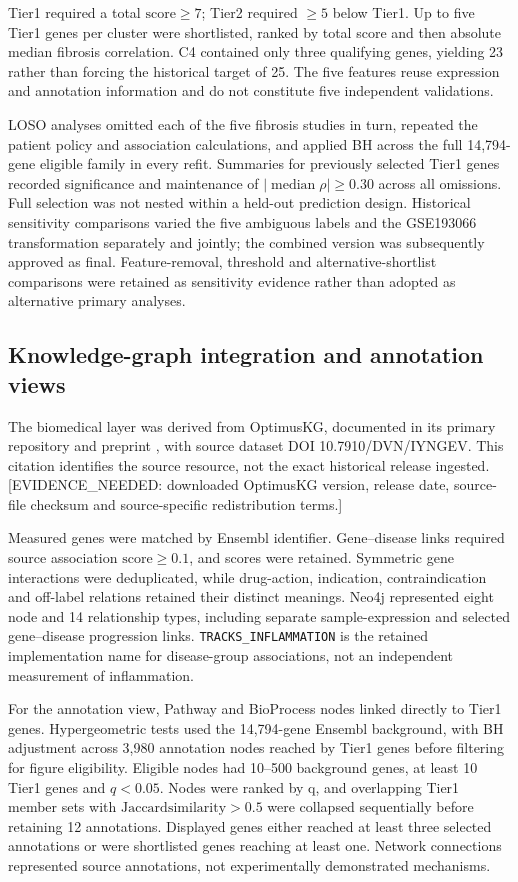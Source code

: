 \documentclass[11pt,a4paper]{article}
\begin{document}
Tier1 required a total \(\mathrm{score}\geq 7\); Tier2 required \(\geq 5\) below Tier1. Up to five Tier1 genes per cluster were shortlisted, ranked by total score and then absolute median fibrosis correlation. C4 contained only three qualifying genes, yielding 23 rather than forcing the historical target of 25. The five features reuse expression and annotation information and do not constitute five independent validations.

LOSO analyses omitted each of the five fibrosis studies in turn, repeated the patient policy and association calculations, and applied BH across the full 14,794-gene eligible family in every refit. Summaries for previously selected Tier1 genes recorded significance and maintenance of \(|\operatorname{median}\rho|\geq0.30\) across all omissions. Full selection was not nested within a held-out prediction design. Historical sensitivity comparisons varied the five ambiguous labels and the GSE193066 transformation separately and jointly; the combined version was subsequently approved as final. Feature-removal, threshold and alternative-shortlist comparisons were retained as sensitivity evidence rather than adopted as alternative primary analyses.

\subsection*{Knowledge-graph integration and annotation views}
The biomedical layer was derived from OptimusKG, documented in its primary repository and preprint \cite{ref5}, with source dataset DOI 10.7910/DVN/IYNGEV. This citation identifies the source resource, not the exact historical release ingested. [EVIDENCE\_NEEDED: downloaded OptimusKG version, release date, source-file checksum and source-specific redistribution terms.]

Measured genes were matched by Ensembl identifier. Gene–disease links required source association \(\mathrm{score}\geq 0.1\), and scores were retained. Symmetric gene interactions were deduplicated, while drug-action, indication, contraindication and off-label relations retained their distinct meanings. Neo4j represented eight node and 14 relationship types, including separate sample-expression and selected gene–disease progression links. \texttt{TRACKS\_INFLAMMATION} is the retained implementation name for disease-group associations, not an independent measurement of inflammation.

For the annotation view, Pathway and BioProcess nodes linked directly to Tier1 genes. Hypergeometric tests used the 14,794-gene Ensembl background, with BH adjustment across 3,980 annotation nodes reached by Tier1 genes before filtering for figure eligibility. Eligible nodes had 10–500 background genes, at least 10 Tier1 genes and \(q<0.05\). Nodes were ranked by q, and overlapping Tier1 member sets with \(\mathrm{Jaccard similarity}>0.5\) were collapsed sequentially before retaining 12 annotations. Displayed genes either reached at least three selected annotations or were shortlisted genes reaching at least one. Network connections represented source annotations, not experimentally demonstrated mechanisms.
\end{document}
